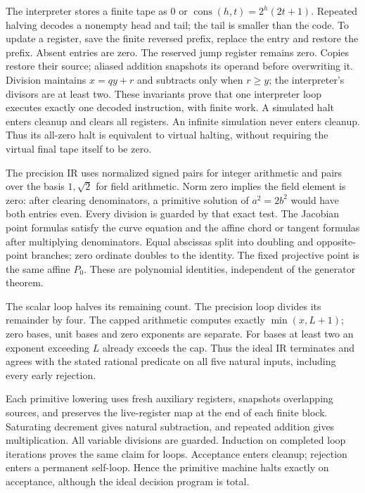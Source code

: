 \documentclass[11pt]{article}
\theoremstyle{definition}
\theoremstyle{remark}
\begin{document}
The interpreter stores a finite tape as
$0$ or $\operatorname{cons}(h,t)=2^h(2t+1)$.
Repeated halving decodes a nonempty head and tail; the tail is smaller
than the code. To update a register, save the finite reversed prefix,
replace the entry and restore the prefix. Absent entries are zero.
The reserved jump register remains zero. Copies restore their source;
aliased addition snapshots its operand before overwriting it.
Division maintains $x=qy+r$ and subtracts only when $r\ge y$;
the interpreter's divisors are at least two.
These invariants prove that one interpreter loop executes exactly one
decoded instruction, with finite work. A simulated halt enters cleanup
and clears all registers. An infinite simulation never enters cleanup.
Thus its all-zero halt is equivalent to virtual halting, without
requiring the virtual final tape itself to be zero.

The precision IR uses normalized signed pairs for integer arithmetic
and pairs over the basis $1,\sqrt2$ for field arithmetic.
Norm zero implies the field element is zero: after clearing
denominators, a primitive solution of $a^2=2b^2$ would have both
entries even. Every division is guarded by that exact test.
The Jacobian point formulas satisfy the curve equation and the affine
chord or tangent formulas after multiplying denominators.
Equal abscissas split into doubling and opposite-point branches;
zero ordinate doubles to the identity. The fixed projective point
is the same affine $P_0$. These are polynomial identities, independent
of the generator theorem.

The scalar loop halves its remaining count. The precision loop divides
its remainder by four. The capped arithmetic computes exactly
$\min(x,L+1)$; zero bases, unit bases and zero exponents are separate.
For bases at least two an exponent exceeding $L$ already exceeds the
cap. Thus the ideal IR terminates and agrees with the stated rational
predicate on all five natural inputs, including every early rejection.

Each primitive lowering uses fresh auxiliary registers, snapshots
overlapping sources, and preserves the live-register map at the end
of each finite block. Saturating decrement gives natural subtraction,
and repeated addition gives multiplication. All variable divisions
are guarded. Induction on completed loop iterations proves the same
claim for loops. Acceptance enters cleanup; rejection enters a
permanent self-loop. Hence the primitive machine halts exactly on
acceptance, although the ideal decision program is total.
\end{document}
